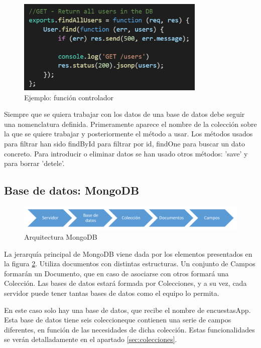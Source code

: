 \documentclass[a4paper, 12pt]{book}
\begin{document}
\begin{figure}[H]
  \centering
  \includegraphics[width=9cm, keepaspectratio]{img/controller.png}
  \caption{Ejemplo: funci\'on controlador}
  \label{f:controller}
\end{figure}

Siempre que se quiera trabajar con los datos de una base de datos debe
seguir una nomenclatura definida. Primeramente aparece el nombre de la colecci\'on sobre la que se quiere
trabajar y posteriormente el m\'etodo a usar. Los m\'etodos usados para filtrar han sido findById para filtrar por id, findOne para buscar un dato concreto. Para introducir o eliminar datos se han usado otros m\'etodos: 'save' y para borrar 'detele'.


\subsection{Base de datos: MongoDB} 
\label{sec:base_datos_mongo}

\begin{figure}[H]
  \centering
  \includegraphics[width=14cm, keepaspectratio]{img/arq_mongo.png}
  \caption{Arquitectura MongoDB}
  \label{f:arq_mongo}
\end{figure}

La jerarqu\'ia principal de MongoDB viene dada por los elementos
presentados en la figura \ref{f:arq_mongo}. Utiliza documentos con distintas estructuras. Un
conjunto de Campos formar\'an un Documento, que en caso de asociarse con
otros formar\'a una Colecci\'on. Las bases de datos estar\'a formada por
Colecciones, y a su vez, cada servidor puede tener tantas bases de datos como el
equipo lo permita.

En este caso solo hay una base de datos, que recibe el nombre de encuestasApp. Esta base de datos tiene seis coleccioneque contienen  una serie de campos diferentes, en funci\'on de las necesidades de dicha colecci\'on. Estas funcionalidades se ver\'an detalladamente en el apartado \ref{sec:colecciones}.
\end{document}
